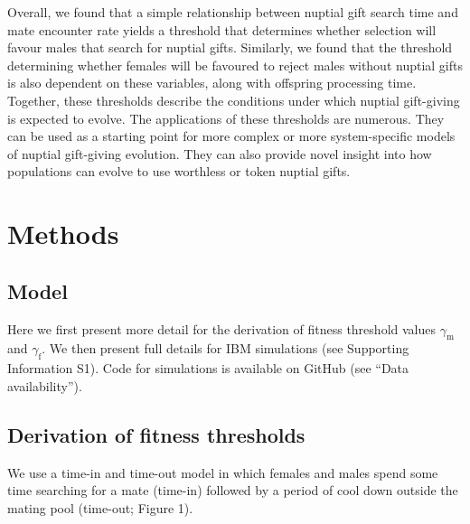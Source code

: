 \documentclass[
]{article}
\begin{document}
Overall, we found that a simple relationship between nuptial gift search
time and mate encounter rate yields a threshold that determines whether
selection will favour males that search for nuptial gifts. Similarly, we
found that the threshold determining whether females will be favoured to
reject males without nuptial gifts is also dependent on these variables,
along with offspring processing time. Together, these thresholds
describe the conditions under which nuptial gift-giving is expected to
evolve. The applications of these thresholds are numerous. They can be
used as a starting point for more complex or more system-specific models
of nuptial gift-giving evolution. They can also provide novel insight
into how populations can evolve to use worthless or token nuptial gifts.

\hypertarget{methods}{%
\section{Methods}\label{methods}}

\hypertarget{model}{%
\subsection{Model}\label{model}}

Here we first present more detail for the derivation of fitness
threshold values \(\gamma_{\mathrm{m}}\) and \(\gamma_{\mathrm{f}}\). We
then present full details for IBM simulations (see Supporting
Information S1). Code for simulations is available on GitHub (see ``Data
availability'').

\hypertarget{derivation-of-fitness-thresholds}{%
\subsection{Derivation of fitness
thresholds}\label{derivation-of-fitness-thresholds}}

We use a time-in and time-out model in which females and males spend
some time searching for a mate (time-in) followed by a period of cool
down outside the mating pool (time-out; Figure 1).
\end{document}
